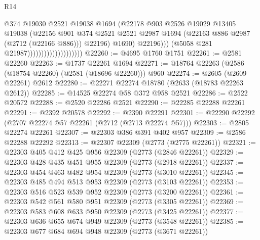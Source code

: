 \begin{lexlean}{R14}
\begin{coremodule}
                                                @374
                                                @19030
                                                @2521
                                                @19038
                                                @1694
                                                (@22178
                                                  @903
                                                  @2526
                                                  @19029
                                                  @13405
                                                  @19038
                                                  (@22156
                                                    @901
                                                    @374
                                                    @2521
                                                    @2521
                                                    @2987
                                                    @1694
                                                    (@22163 @886 @2987 (@2712 (@22166 @886)))
                                                    @22196)
                                                  @1690)
                                                @22196)))
                                          (@5058 @281 @21987))))))))))))))))))))
@22260 := @4695 @1760 @1751
@22261 := @2581 @22260
@22263 := @1737 @22261 @1694
@22271 := @18764 @22263 (@2586 (@18754 @22260) (@2581 (@18696 @22260))) @960
@22274 := @2605 (@2609 @22261) @2612
@22280 := @22271 @22274 @18780 (@2633 (@18783 @22263 @2612))
@22285 := @14525 @22274 @58 @372 @958 @2521
@22286 := @2522 @20572
@22288 := @2520 @22286 @2521
@22290 := @22285 @22288 @22261
@22291 := @2392 @20578
@22292 := @2390 @22291
@22301 := @22290 @22292 (@2707 @22274 @57 @22261 (@2712 (@2713 @22274 @57)))
@22303 := @2805 @22274 @22261
@22307 := @22303 @386 @391 @402 @957
@22309 := @2586 @22288 @22292
@22313 := @22307 @22309 (@2773 (@2775 @22261))
@22321 := @22303 @405 @412 @425 @956 @22309 (@2773 (@2846 @22261))
@22329 := @22303 @428 @435 @451 @955 @22309 (@2773 (@2918 @22261))
@22337 := @22303 @454 @463 @482 @954 @22309 (@2773 (@3010 @22261))
@22345 := @22303 @485 @494 @513 @953 @22309 (@2773 (@3103 @22261))
@22353 := @22303 @516 @523 @539 @952 @22309 (@2773 (@3200 @22261))
@22361 := @22303 @542 @561 @580 @951 @22309 (@2773 (@3305 @22261))
@22369 := @22303 @583 @608 @633 @950 @22309 (@2773 (@3425 @22261))
@22377 := @22303 @636 @655 @674 @949 @22309 (@2773 (@3548 @22261))
@22385 := @22303 @677 @684 @694 @948 @22309 (@2773 (@3671 @22261))

\end{coremodule}
\end{lexlean}
